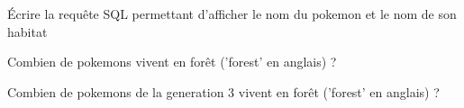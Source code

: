 \question{}
\'Ecrire la requête SQL permettant d'afficher le nom du pokemon et le nom de son habitat

\question{}
Combien de pokemons vivent en forêt ('forest' en anglais) ?

\question{}
Combien de pokemons de la generation 3 vivent en forêt ('forest' en anglais) ?


%
%
%
%
%
%
%
%
%
%
%
%
%
%
